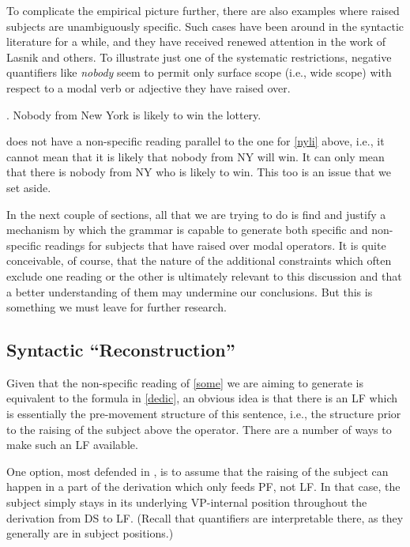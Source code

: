 To complicate the empirical picture further, there are also examples where raised subjects are unambiguously specific. Such cases have been around in the syntactic literature for a while, and they have received renewed attention in the work of Lasnik and others. To illustrate just one of the systematic restrictions, negative quantifiers like \emph{nobody} seem to permit only surface scope (i.e., wide scope) with respect to a modal verb or adjective they have raised over.

\ex. Nobody from New York is likely to win the lottery.

\Last does not have a non-specific reading parallel to the one for \ref{nyli} above, i.e., it cannot mean that it is likely that nobody from NY will win. It can only mean that there is nobody from NY who is likely to win. This too is an issue that we set aside.

In the next couple of sections, all that we are trying to do is find and justify a mechanism by which the grammar is capable to generate both specific and non-specific readings for subjects that have raised over modal operators. It is quite conceivable, of course, that the nature of the additional constraints which often exclude one reading or the other is ultimately relevant to this discussion and that a better understanding of them may undermine our conclusions. But this is something we must leave for further research.

\subsection{Syntactic ``Reconstruction''}

Given that the non-specific reading of \ref{some} we are aiming to generate is equivalent to the formula in \ref{dedic}, an obvious idea is that there is an LF which is essentially the pre-movement structure of this sentence, i.e., the structure prior to the raising of the subject above the operator. There are a number of ways to make such an LF available.

One option, most defended in \citet{sauerland-elbourne:2002:total}, is to assume that the raising of the subject can happen in a part of the derivation which only feeds PF, not LF. In that case, the subject simply stays in its underlying VP-internal position throughout the derivation from DS to LF. (Recall that quantifiers are interpretable there, as they generally are in subject positions.)

